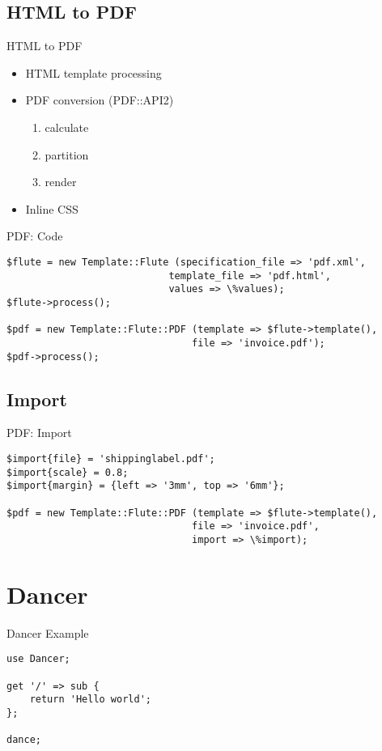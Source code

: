 \subsection{HTML to PDF}
\begin{frame}{HTML to PDF}
  \begin{itemize}
  \item HTML template processing
  \item PDF conversion (PDF::API2)
    \begin{enumerate}
    \item calculate
    \item partition
    \item render
    \end{enumerate}
  \item Inline CSS 
  \end{itemize}
\end{frame}

\begin{frame}[fragile]{PDF: Code}
\begin{lstlisting}
$flute = new Template::Flute (specification_file => 'pdf.xml',
                            template_file => 'pdf.html',
                            values => \%values);
$flute->process();

$pdf = new Template::Flute::PDF (template => $flute->template(),
                                file => 'invoice.pdf');
$pdf->process();
\end{lstlisting}
\end{frame}

\subsection{Import}
\begin{frame}[fragile]{PDF: Import}
\begin{lstlisting}
$import{file} = 'shippinglabel.pdf';
$import{scale} = 0.8;
$import{margin} = {left => '3mm', top => '6mm'};

$pdf = new Template::Flute::PDF (template => $flute->template(),
                                file => 'invoice.pdf',
                                import => \%import);
\end{lstlisting}
\end{frame}

\section{Dancer}
\begin{frame}[fragile]{Dancer Example}
\begin{lstlisting}
use Dancer;

get '/' => sub {
    return 'Hello world';
};

dance;
\end{lstlisting}
\end{frame}

